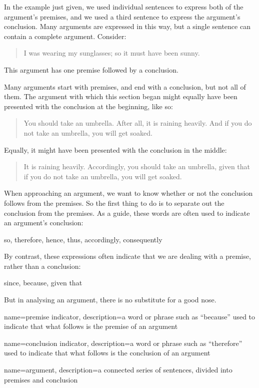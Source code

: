 In the example just given, we used individual sentences to express both of the argument's premises, and we used a third sentence to express the argument's conclusion. Many arguments are expressed in this way, but a single sentence can contain a complete argument. Consider:
	\begin{quote}
		 I was wearing my sunglasses; so it must have been sunny.
	\end{quote}
This argument has one premise followed by a conclusion. 

Many arguments start with premises, and end with a conclusion, but not all of them. The argument with which this section began might equally have been presented with the conclusion at the beginning, like so:
	\begin{quote}
		You should take an umbrella. After all, it is raining heavily. And if you do not take an umbrella, you will get soaked. 
	\end{quote}
Equally, it might have been presented with the conclusion in the middle:
	\begin{quote}
		It is raining heavily. Accordingly, you should take an umbrella, given that if you do not take an umbrella, you will get soaked.
	\end{quote}
When approaching an argument, we want to know whether or not the conclusion follows from the premises. So the first thing to do is to separate out the conclusion from the premises. As a guide, these words are often used to indicate an argument's conclusion:
	\begin{center}
		so, therefore, hence, thus, accordingly, consequently
	\end{center}
By contrast, these expressions often indicate that we are dealing with a premise, rather than a conclusion:
	\begin{center}
		since, because, given that
	\end{center}
But in analysing an argument, there is no substitute for a good nose.

{
name=premise indicator,
description={a word or phrase such as ``because'' used to indicate that what follows is the premise of an argument}
}

{
name=conclusion indicator,
description={a word or phrase such as ``therefore'' used to indicate that what follows is the conclusion of an argument}
}

{
name=argument,
description={a connected series of sentences, divided into \gls{premise}s and \gls{conclusion}}
}


